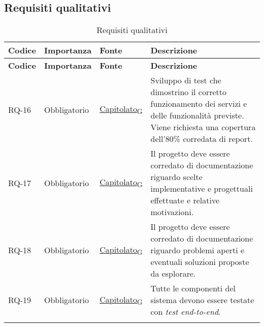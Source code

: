 \subsection{Requisiti qualitativi}
\begin{longtable}{|>{\centering\arraybackslash}m{}|>{\centering\arraybackslash}m{}|>{\centering\arraybackslash}m{}|>{\centering\arraybackslash}m{}|}
	\hline
	\textbf{Codice} & \textbf{Importanza} & \textbf{Fonte} & \textbf{Descrizione}                                                                                                                                              \\\hline
	\endfirsthead
	\textbf{Codice} & \textbf{Importanza} & \textbf{Fonte} & \textbf{Descrizione}                                                                                                                                              \\\hline
	\endhead
	RQ-16           & Obbligatorio        & \href{https://7last.github.io/docs/rtb/documentazione-interna/glossario#capitolato}{Capitolato\textsubscript{G}}     & Sviluppo di test che dimostrino il corretto funzionamento dei servizi e delle funzionalità previste. Viene richiesta una copertura dell'80\% corredata di report. \\\hline
	RQ-17           & Obbligatorio        & \href{https://7last.github.io/docs/rtb/documentazione-interna/glossario#capitolato}{Capitolato\textsubscript{G}}     & Il progetto deve essere corredato di documentazione riguardo scelte implementative e progettuali effettuate e relative motivazioni.                               \\\hline
	RQ-18           & Obbligatorio        & \href{https://7last.github.io/docs/rtb/documentazione-interna/glossario#capitolato}{Capitolato\textsubscript{G}}     & Il progetto deve essere corredato di documentazione riguardo problemi aperti e eventuali soluzioni proposte da esplorare.                                         \\\hline
	RQ-19           & Obbligatorio        & \href{https://7last.github.io/docs/rtb/documentazione-interna/glossario#capitolato}{Capitolato\textsubscript{G}}     & Tutte le componenti del sistema devono essere testate con \textit{test end-to-end}.                                                                               \\\hline
	\caption{Requisiti qualitativi}
	\label{table:2}
\end{longtable}

